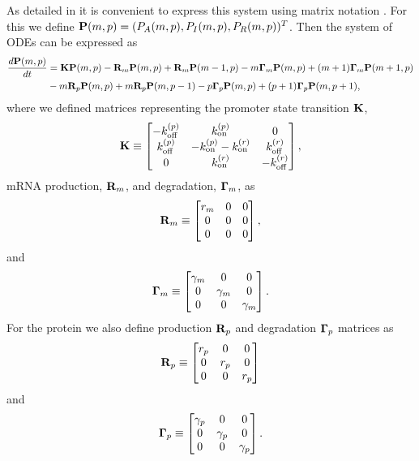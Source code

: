 As detailed in  it is convenient to express this system using
matrix notation \cite{Sanchez2013}. For this we define $\mathbf{P}(m, p) = (P_A(m, p),
P_I(m, p), P_R(m, p))^T$. Then the system of ODEs can be expressed as
\begin{equation}
  \begin{aligned}
    {d{\mathbf{P}(m, p)} \over dt} &= \mathbf{K} \mathbf{P}(m, p)
    - \mathbf{R}_m \mathbf{P}(m, p) + \mathbf{R}_m \mathbf{P}(m-1, p)
    - m \mathbf{\Gamma}_m \mathbf{P}(m, p) + (m + 1) \mathbf{\Gamma}_m \mathbf{P}(m + 1, p)\\
    &- m \mathbf{R}_p \mathbf{P}(m, p) + m \mathbf{R}_p \mathbf{P}(m, p - 1)
    - p \mathbf{\Gamma}_p \mathbf{P}(m, p) + (p + 1) \mathbf{\Gamma}_p \mathbf{P}(m, p + 1),
  \end{aligned}
\end{equation}
where we defined matrices representing the promoter state transition $\mathbf{K}$,
\begin{align}
  \mathbf{K} \equiv
  \begin{bmatrix}
    -k^{(p)}_{\text{off}}   & k^{(p)}_{\text{on}}         & 0\\
    k^{(p)}_{\text{off}}    & -k^{(p)}_{\text{on}} -k^{(r)}_{\text{on}}  & k^{(r)}_{\text{off}}\\
    0         & k^{(r)}_{\text{on}}         & -k^{(r)}_{\text{off}}
  \end{bmatrix},
\end{align}
mRNA production, $\mathbf{R}_m$, and degradation, $\mathbf{\Gamma}_m$, as
\begin{equation}
  \mathbf{R}_m \equiv
  \begin{bmatrix}
    r_m   & 0 & 0\\
    0     & 0 & 0\\
    0     & 0 & 0\\
  \end{bmatrix},
\end{equation}
and
\begin{equation}
  \mathbf{\Gamma}_m \equiv
  \begin{bmatrix}
    \gamma _m   & 0   & 0\\
    0     & \gamma _m & 0\\
    0     & 0   & \gamma _m\\
  \end{bmatrix}.
\end{equation}
For the protein we also define production $\mathbf{R}_p$ and degradation $\mathbf{\Gamma}_p$ matrices
as
\begin{equation}
  \mathbf{R}_p \equiv
  \begin{bmatrix}
    r_p   & 0   & 0\\
    0     & r_p & 0\\
    0     & 0   & r_p\\
  \end{bmatrix}
\end{equation}
and
\begin{equation}
  \mathbf{\Gamma}_p \equiv
  \begin{bmatrix}
    \gamma _p   & 0   & 0\\
    0     & \gamma _p & 0\\
    0     & 0   & \gamma _p\\
  \end{bmatrix}.
\end{equation}

